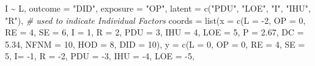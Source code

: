 \documentclass[
]{article}
\newenvironment{Shaded}{\begin{snugshade}}{\end{snugshade}}
\newcommand{\AttributeTok}[1]{\textcolor[rgb]{0.77,0.63,0.00}{#1}}
\newcommand{\CommentTok}[1]{\textcolor[rgb]{0.56,0.35,0.01}{\textit{#1}}}
\newcommand{\DecValTok}[1]{\textcolor[rgb]{0.00,0.00,0.81}{#1}}
\newcommand{\FloatTok}[1]{\textcolor[rgb]{0.00,0.00,0.81}{#1}}
\newcommand{\FunctionTok}[1]{\textcolor[rgb]{0.00,0.00,0.00}{#1}}
\newcommand{\NormalTok}[1]{#1}
\newcommand{\SpecialCharTok}[1]{\textcolor[rgb]{0.00,0.00,0.00}{#1}}
\newcommand{\StringTok}[1]{\textcolor[rgb]{0.31,0.60,0.02}{#1}}
\begin{document}
\begin{Shaded}
\begin{Highlighting}[]
\NormalTok{                                          I }\SpecialCharTok{\textasciitilde{}}\NormalTok{ L,}
                                          \AttributeTok{outcome =} \StringTok{"DID"}\NormalTok{,}
                                          \AttributeTok{exposure =} \StringTok{"OP"}\NormalTok{,}
                                          \AttributeTok{latent =} \FunctionTok{c}\NormalTok{(}\StringTok{"PDU"}\NormalTok{, }\StringTok{"LOE"}\NormalTok{, }\StringTok{"I"}\NormalTok{, }\StringTok{"IHU"}\NormalTok{, }\StringTok{"R"}\NormalTok{), }\CommentTok{\# used to indicate Individual Factors}
                                          \AttributeTok{coords =} \FunctionTok{list}\NormalTok{(}\AttributeTok{x =} \FunctionTok{c}\NormalTok{(}\AttributeTok{L =} \SpecialCharTok{{-}}\DecValTok{2}\NormalTok{,}
                                                              \AttributeTok{OP =} \DecValTok{0}\NormalTok{,}
                                                              \AttributeTok{RE =} \DecValTok{4}\NormalTok{, }\AttributeTok{SE =} \DecValTok{6}\NormalTok{,}
                                                              \AttributeTok{I =} \DecValTok{1}\NormalTok{, }\AttributeTok{R =} \DecValTok{2}\NormalTok{, }\AttributeTok{PDU =} \DecValTok{3}\NormalTok{, }\AttributeTok{IHU =} \DecValTok{4}\NormalTok{, }\AttributeTok{LOE =} \DecValTok{5}\NormalTok{,}
                                                              \AttributeTok{P =} \FloatTok{2.67}\NormalTok{,}
                                                              \AttributeTok{DC =} \FloatTok{5.34}\NormalTok{,}
                                                              \AttributeTok{NFNM =} \DecValTok{10}\NormalTok{,}
                                                              \AttributeTok{HOD =} \DecValTok{8}\NormalTok{,}
                                                              \AttributeTok{DID =} \DecValTok{10}\NormalTok{), }
                                                        \AttributeTok{y =}  \FunctionTok{c}\NormalTok{(}\AttributeTok{L =} \DecValTok{0}\NormalTok{,}
                                                              \AttributeTok{OP =} \DecValTok{0}\NormalTok{,}
                                                              \AttributeTok{RE =} \DecValTok{4}\NormalTok{, }\AttributeTok{SE =} \DecValTok{5}\NormalTok{,}
                                                              \AttributeTok{I=} \SpecialCharTok{{-}}\DecValTok{1}\NormalTok{, }\AttributeTok{R =} \SpecialCharTok{{-}}\DecValTok{2}\NormalTok{, }\AttributeTok{PDU =} \SpecialCharTok{{-}}\DecValTok{3}\NormalTok{, }\AttributeTok{IHU =} \SpecialCharTok{{-}}\DecValTok{4}\NormalTok{, }\AttributeTok{LOE =} \SpecialCharTok{{-}}\DecValTok{5}\NormalTok{,}

\end{Highlighting}
\end{Shaded}
\end{document}
